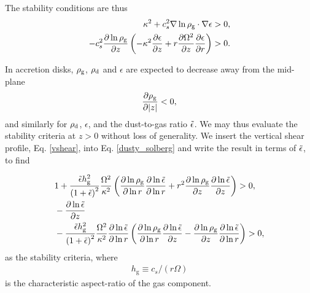 
The stability conditions are thus
\begin{align}\label{dusty_solberg}
  \kappa^2 + c_s^2 \nabla\ln{\rho_\mathrm{g}}\cdot\nabla\epsilon &> 0,  \\
  -c_s^2\frac{\partial\ln{\rho_\mathrm{g}}}{\partial z}\left(-\kappa^2\frac{\partial\epsilon}{\partial
    z} + r\frac{\partial\Omega^2}{\partial z}\frac{\partial \epsilon}{\partial r} \right) & > 0. 
\end{align}

In accretion disks, $\rho_\mathrm{g}$, $\rho_\mathrm{d}$ and $\epsilon$ are expected to
decrease away from the mid-plane
\begin{align*}  
  \frac{\partial\rho_\mathrm{g}}{\partial |z|} < 0,
\end{align*}
and similarly for $\rho_\mathrm{d}$, $\epsilon$, and the dust-to-gas ratio $\tilde{\epsilon}$. 
We may thus evaluate the stability criteria at $z>0$ without loss of
generality. We insert the vertical shear profile,
Eq. \ref{vshear}, into Eq. \ref{dusty_solberg} and write the result 
in terms of $\tilde{\epsilon}$, to find 

\begin{align} 
  &1 + \frac{\tilde{\epsilon} h_\mathrm{g}^2}{\left(1+
    \tilde{\epsilon}\right)^2}\frac{\Omega^2}{\kappa^2}\left(\frac{\partial\ln{\rho_\mathrm{g}}}{\partial\ln{r}}
  \frac{\partial\ln{\tilde{\epsilon}}}{\partial\ln{r}} + r^2\frac{\partial\ln{\rho_\mathrm{g}}}{\partial z}
  \frac{\partial\ln{\tilde{\epsilon}}}{\partial z} \right)>0,   \\
&-\frac{\partial\ln{\tilde{\epsilon}}}{\partial z} \notag\\
  &- \frac{\tilde{\epsilon}
  h_\mathrm{g}^2}{\left(1+\tilde{\epsilon}\right)^2}\frac{\Omega^2}{\kappa^2}
\frac{\partial\ln{\tilde{\epsilon}}}{\partial\ln{r}}\left( \frac{\partial\ln{\rho_\mathrm{g}}}{\partial\ln{r}}\frac{\partial\ln{\tilde{\epsilon}}}{\partial
    z} -\frac{\partial\ln{\rho_\mathrm{g}}}{\partial z}\frac{\partial\ln{\tilde{\epsilon}}}{\partial\ln{
    r}}\right) > 0,
\end{align}
as the stability criteria, where 
\begin{align}
  h_\mathrm{g}\equiv c_s/\left(r\Omega\right)
\end{align}
is the characteristic aspect-ratio of the gas component. 



